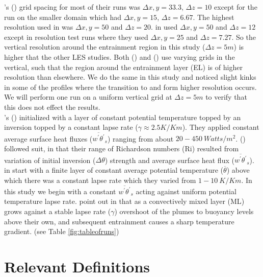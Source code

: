 \citeauthor{SullMoengStev}'s (\cite{SullMoengStev}) grid spacing for most of their runs was $\Delta x, y= 33.3$, $\Delta z=10$ except for the run on the smaller domain which had $\Delta x, y = 15$, $\Delta z=6.67$.  The highest resolution \citeauthor{FedConzMir04} used in \cite{FedConzMir04} was $\Delta x, y = 50$ and $\Delta z = 20$.  \citeauthor{BrooksFowler2} in \cite{BrooksFowler2} used $\Delta x, y = 50$ and $\Delta z = 12$ except in resolution test runs where they used $\Delta x, y = 25$ and $\Delta z = 7.27$.  So the vertical resolution around the entrainment region in this study ($\Delta z= 5m$) is higher that the other LES studies. Both \citeauthor{SullMoengStev} (\cite{SullMoengStev}) and \citeauthor{BrooksFowler2} (\cite{BrooksFowler2}) use varying grids in the vertical, such that the region around the entrainment layer (\acs{EL}) is of higher resolution than elsewhere. We do the same in this study and noticed slight kinks in some of the profiles where the transition to and form higher resolution occurs. We will perform one run on a uniform vertical grid at $\Delta z=5m$ to verify that this does not effect the results.\\          

\citeauthor{SullMoengStev}'s (\cite{SullMoengStev}) initialized with a layer of constant potential temperature topped by an inversion topped by a constant lapse rate ($\gamma \approx 2.5 K/Km$). They applied constant average surface heat fluxes ($\overline{w^{'}\theta^{'}}_{s}$) ranging from about $20 - 450 \ Watts/m^{2}$. \citeauthor{BrooksFowler2} (\cite{BrooksFowler2}) followed suit, in that their range of Richardson numbers (\acs{Ri}) resulted from variation of initial inversion ($\Delta \theta$) strength and average surface heat flux ($\overline{w^{'}\theta^{'}}_{s}$).  \citeauthor{FedConzMir04} in \cite{FedConzMir04} start with a finite layer of constant average potential temperature ($\overline{\theta}$) above which there was a constant lapse rate which they varied from  $1 - 10 \ K/Km$. In this study we begin with a constant $\overline{w^{'}\theta^{'}}_{s}$ acting against uniform potential temperature lapse rate.  \citeauthor{SchmidtSchu} point out in \cite{SchmidtSchu} that as a convectively mixed layer (\acs{ML}) grows against a stable lapse rate ($\gamma$) overshoot of the plumes to buoyancy levels above their own, and subsequent entrainment causes a sharp temperature gradient. (see Table \ref{fig:tableofruns}) 


\section{Relevant Definitions}


